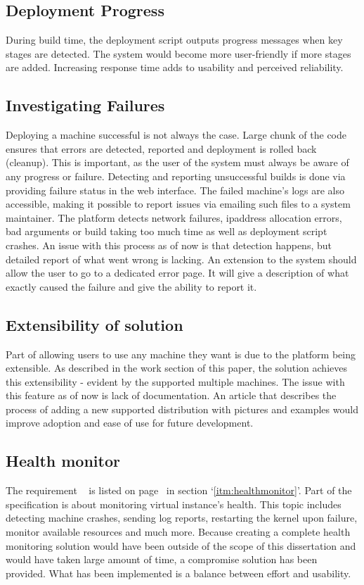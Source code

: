 \documentclass{article}
\begin{document}
\subsection{Deployment Progress}
During build time, the deployment script outputs progress messages when key stages are detected. The system would become more user-friendly if more stages are added. Increasing response time adds to usability and perceived reliability.

\subsection{Investigating Failures}
Deploying a machine successful is not always the case. Large chunk of the code ensures that errors are detected, reported and deployment is rolled back (cleanup). This is important, as the user of the system must always be aware of any progress or failure.
Detecting and reporting unsuccessful builds is done via providing failure status in the web interface. The failed machine's logs are also accessible, making it possible to report issues via emailing such files to a system maintainer. The platform detects network failures, \gls{ipaddress} allocation errors, bad arguments or build taking too much time as well as deployment script crashes.
An issue with this process as of now is that detection happens, but detailed report of what went wrong is lacking. An extension to the system should allow the user to go to a dedicated error page. It will give a description of what exactly caused the failure and give the ability to report it.

\subsection{Extensibility of solution}
Part of allowing users to use any machine they want is due to the platform being extensible. As described in the work section of this paper, the solution achieves this extensibility - evident by the supported multiple machines.
The issue with this feature as of now is lack of documentation. An article that describes the process of adding a new supported distribution with pictures and examples would  improve adoption and ease of use for future development.

\subsection{Health monitor}
The requirement ~  is listed on page~\pageref{itm:healthmonitor} in section `\ref{itm:healthmonitor}'.
Part of the specification is about monitoring virtual instance's health. This topic includes detecting machine crashes, sending log reports, restarting the \gls{kernel} upon failure, monitor available resources and much more. Because creating a complete health monitoring solution would have been outside of the scope of this dissertation and would have taken large amount of time, a compromise solution has been provided. What has been implemented is a balance between effort and usability.
\end{document}
